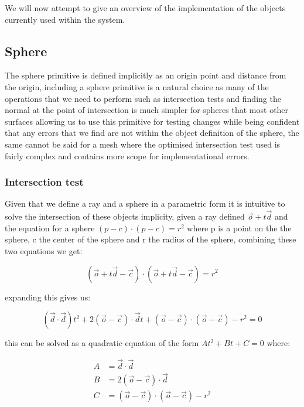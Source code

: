 We will now attempt to give an overview of the implementation of the objects currently used within the system.

\subsection{Sphere}
The sphere primitive is defined implicitly as an origin point and distance from the origin, including a sphere primitive is
a natural choice as many of the operations that we need to perform such as intersection tests and finding the normal at the
point of intersection is much simpler for spheres that most other surfaces allowing us to use this primitive for testing
changes while being confident that any errors that we find are not within the object definition of the sphere, the same cannot
be said for a mesh where the optimised intersection test used is fairly complex and contains more scope for implementational errors.

\subsubsection{Intersection test}
Given that we define a ray and a sphere in a parametric form it is intuitive to solve the intersection of these objects implicity,
given a ray defined $\vec{o} + t \vec{d}$ and the equation for a sphere $(p - c) \cdot (p - c) = r^2$ where p is a point on the the
sphere, c the center of the sphere and r the radius of the sphere, combining these two equations we get:

\begin{equation*}
(\vec{o} + t\vec{d} -\vec{c}) \cdot (\vec{o} + t\vec{d} - \vec{c}) = r^2
\end{equation*}

expanding this gives us:

\begin{equation*}
(\vec{d} \cdot \vec{d})t^2 + 2(\vec{o} - \vec{c}) \cdot \vec{d}t + (\vec{o} - \vec{c}) \cdot (\vec{o} - \vec{c}) - r^2 = 0
\end{equation*}

this can be solved as a quadratic equation of the form $At^2 + Bt + C = 0$ where:

\begin{align*}
A &= \vec{d} \cdot \vec{d}\\
B &= 2(\vec{o} - \vec{c}) \cdot \vec{d}\\
C &= (\vec{o} - \vec{c}) \cdot (\vec{o} - \vec{c}) - r^2\\
\end{align*}

